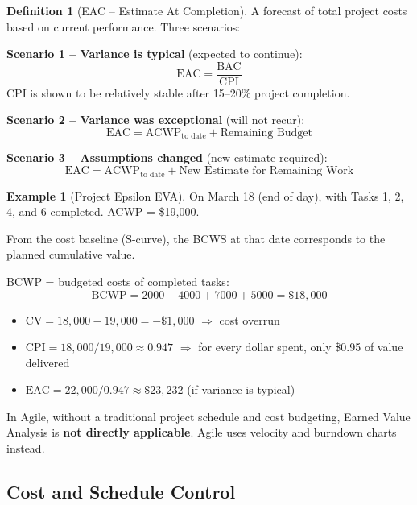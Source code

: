\documentclass[11pt,a4paper]{article}
\theoremstyle{definition}
\newtheorem{definition}{Definition}[section]
\newtheorem{example}{Example}[section]
\theoremstyle{plain}
\begin{document}
\begin{definition}[EAC -- Estimate At Completion]
A forecast of total project costs based on current performance. Three scenarios:
\end{definition}

\begin{formulabox}
\textbf{Scenario 1 -- Variance is typical} (expected to continue):
\[
  \mathrm{EAC} = \frac{\mathrm{BAC}}{\mathrm{CPI}}
\]
CPI is shown to be relatively stable after 15--20\% project completion.

\textbf{Scenario 2 -- Variance was exceptional} (will not recur):
\[
  \mathrm{EAC} = \mathrm{ACWP}_{\text{to date}} + \text{Remaining Budget}
\]

\textbf{Scenario 3 -- Assumptions changed} (new estimate required):
\[
  \mathrm{EAC} = \mathrm{ACWP}_{\text{to date}} + \text{New Estimate for Remaining Work}
\]
\end{formulabox}

\begin{example}[Project Epsilon EVA]
On March 18 (end of day), with Tasks 1, 2, 4, and 6 completed. ACWP = \$19{,}000.

From the cost baseline (S-curve), the BCWS at that date corresponds to the planned cumulative value.

BCWP = budgeted costs of completed tasks:
\[
  \mathrm{BCWP} = 2000 + 4000 + 7000 + 5000 = \$18{,}000
\]
\begin{itemize}[nosep]
  \item $\mathrm{CV} = 18{,}000 - 19{,}000 = -\$1{,}000$ $\Rightarrow$ cost overrun
  \item $\mathrm{CPI} = 18{,}000 / 19{,}000 \approx 0.947$ $\Rightarrow$ for every dollar spent, only \$0.95 of value delivered
  \item $\mathrm{EAC} = 22{,}000 / 0.947 \approx \$23{,}232$ (if variance is typical)
\end{itemize}
\end{example}

\begin{remark}
In Agile, without a traditional project schedule and cost budgeting, Earned Value Analysis is \textbf{not directly applicable}. Agile uses velocity and burndown charts instead.
\end{remark}

\subsection{Cost and Schedule Control}
\end{document}
